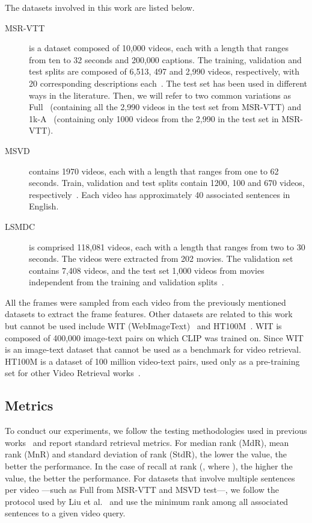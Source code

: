 \documentclass[a4paper,runningheads]{llncs}
\begin{document}
The datasets involved in this work are listed below.

\begin{description}
    \item [MSR-VTT] is a dataset composed of 10,000 videos, each with a length that ranges from ten to 32 seconds and 200,000 captions. The training, validation and test splits are composed of 6,513, 497 and 2,990 videos, respectively, with 20 corresponding descriptions each~\cite{Xu2016MSR}. The test set has been used in different ways in the literature. Then, we will refer to two common variations as Full~\cite{Liu2020CE} (containing all the 2,990 videos in the test set from MSR-VTT) and 1k-A~\cite{Yu2018JSFusion} (containing only 1000 videos from the 2,990 in the test set in MSR-VTT).
    \item [MSVD] contains 1970 videos, each with a length that ranges from one to 62 seconds. Train, validation and test splits contain 1200, 100 and 670 videos, respectively~\cite{Chen2011MSVD}. Each video has approximately 40 associated sentences in English.
    \item [LSMDC] is comprised 118,081 videos, each with a length that ranges from two to 30 seconds. The videos were extracted from 202 movies. The validation set contains 7,408 videos, and the test set 1,000 videos from movies independent from the training and validation splits~\cite{Rohrbach2015LSMDC}.
\end{description}

All the frames were sampled from each video from the previously mentioned datasets to extract the frame features. Other datasets are related to this work but cannot be used include WIT (WebImageText)~\cite{Radford2021CLIP} and HT100M~\cite{Miech2019HTM100}. WIT is composed of 400,000 image-text pairs on which CLIP was trained on. Since WIT is an image-text dataset that cannot be used as a benchmark for video retrieval. HT100M is a dataset of 100 million video-text pairs, used only as a pre-training set for other Video Retrieval works~\cite{Gabeur2020MMT,Miech2019HTM100,Patrick2021supportset,Rouditchenko2020avlnet}.

\subsection{Metrics}
\label{sec:Metrics}

To conduct our experiments, we follow the testing methodologies used in previous works~\cite{Gabeur2020MMT,Liu2020CE} and report standard retrieval metrics. For median rank (MdR), mean rank (MnR) and standard deviation of rank (StdR), the lower the value, the better the performance. In the case of recall at rank (, where ), the higher the value, the better the performance. For datasets that involve multiple sentences per video ---such as Full from MSR-VTT and MSVD test---, we follow the protocol used by Liu et al.~\cite{Liu2020CE} and use the minimum rank among all associated sentences to a given video query.
\end{document}
